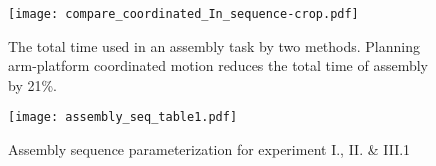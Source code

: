 \begin{figure}[!htbp]
\centering
\texttt{[image: compare\_coordinated\_In\_sequence-crop.pdf]}
\captionsetup{justification=raggedright}
\caption{The total time used in an assembly task by two methods. Planning arm-platform coordinated motion reduces the total time of assembly by 21\%.}
\label{fig:compare_coordinated_vs_in_sequence}       %
\end{figure} 
\begin{figure}[!htbp]
\centering
\texttt{[image: assembly\_seq\_table1.pdf]}
\captionsetup{justification=raggedright}
\caption{Assembly sequence parameterization for experiment I., II. \& III.1}
\label{fig:assembly_sequence_exp1}       %
\end{figure} 


